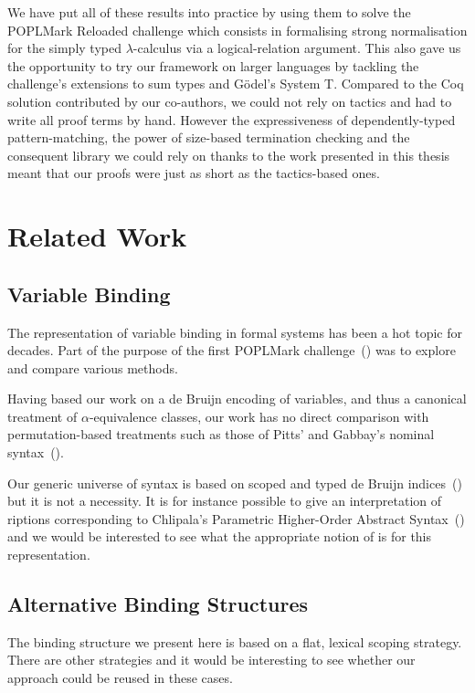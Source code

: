 We have put all of these results into practice by using them to solve the
POPLMark Reloaded challenge which consists in formalising strong
normalisation for the simply typed $\lambda$-calculus via a logical-relation
argument. This also gave us the opportunity to try our framework on larger
languages by tackling the challenge's extensions to sum types and G\"{o}del's
System T. Compared to the Coq solution contributed by our co-authors, we could
not rely on tactics and had to write all proof terms by hand. However the
expressiveness of dependently-typed pattern-matching, the power of size-based
termination checking and the consequent library we could rely on thanks to the
work presented in this thesis meant that our proofs were just as short as
the tactics-based ones.

\section{Related Work}


\subsection{Variable Binding} The representation of variable binding
in formal systems has been a hot topic for decades. Part of the purpose
of the first POPLMark challenge~(\citeyear{poplmark}) was to explore and
compare various methods.

Having based our work on a de Bruijn encoding of variables, and thus a
canonical treatment of \(\alpha\)-equivalence classes, our work has no
direct comparison with permutation-based treatments such as those of
Pitts' and Gabbay's nominal syntax~(\citeyear{gabbay:newaas-jv}).

Our generic universe of syntax is based on
scoped and typed de Bruijn indices~(\citeyear{de1972lambda}) but it is not
a necessity. It is for instance possible to give an interpretation
of riptions corresponding to Chlipala's Parametric Higher-Order
Abstract Syntax~(\citeyear{DBLP:conf/icfp/Chlipala08}) and we would be interested
to see what the appropriate notion of  is for this representation.

\subsection{Alternative Binding Structures} The binding structure we
present here is based on a flat, lexical scoping strategy. There are
other strategies and it would be interesting to see whether
our approach could be reused in these cases.

